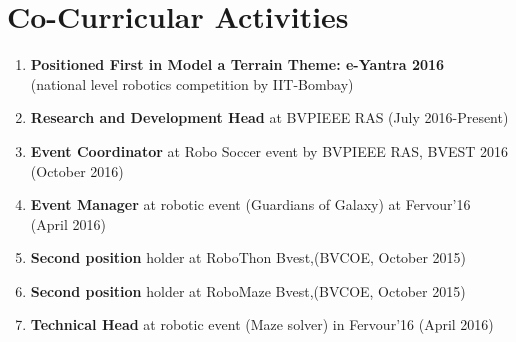 \documentclass[11pt]{article}
\begin{document}
\begin{minipage}{1.5\linewidth}
\section{\color{green}Co-C\color{black}urricular Activities}
\begin{enumerate}
\item \textbf{Positioned First in Model a Terrain Theme: e-Yantra 2016} \\(national level robotics competition  by IIT-Bombay) 
\item \textbf{Research  and  Development Head} at BVPIEEE RAS (July 2016-Present)
\item \textbf{Event Coordinator} at Robo Soccer event by BVPIEEE RAS, BVEST 2016 \\(October 2016)
\item \textbf{Event Manager} at robotic event (Guardians of Galaxy) at Fervour'16 (April 2016)
\item \textbf{Second position} holder at RoboThon Bvest,(BVCOE, October 2015)
\item \textbf{Second position} holder at RoboMaze Bvest,(BVCOE, October 2015)
\item \textbf{Technical Head} at robotic event (Maze solver) in Fervour'16 (April 2016)

\end{enumerate}
\end{minipage}
\end{document}

